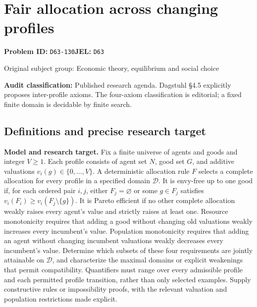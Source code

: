 \documentclass[11pt,a4paper]{article}
\begin{document}
\section*{Fair allocation across changing profiles}
\textbf{Problem ID:} \texttt{D63-130}\quad \textbf{JEL:} \texttt{D63}\par
\label{problem:OP-0278}
{\sffamily\small\color{muted}Original subject group: Economic theory, equilibrium and social choice\par}
\label{definitions:problem:30007560}
\textbf{Audit classification:} Published research agenda. Dagstuhl §4.5 explicitly proposes inter-profile axioms. The four-axiom classification is editorial; a fixed finite domain is decidable by finite search.
\subsection*{Definitions and precise research target}
\textbf{Model and research target.} Fix a finite universe of agents and goods and integer \(V\geq1\). Each profile consists of agent set \(N\), good set \(G\), and additive valuations \(v_i(g)\in\{0,\ldots,V\}\). A deterministic allocation rule \(F\) selects a complete allocation for every profile in a specified domain \(\mathcal D\). It is envy-free up to one good if, for each ordered pair \(i,j\), either \(F_j=\varnothing\) or some \(g\in F_j\) satisfies \(v_i(F_i)\geq v_i(F_j\setminus\{g\})\). It is Pareto efficient if no other complete allocation weakly raises every agent's value and strictly raises at least one. Resource monotonicity requires that adding a good without changing old valuations weakly increases every incumbent's value. Population monotonicity requires that adding an agent without changing incumbent valuations weakly decreases every incumbent's value. Determine which subsets of these four requirements are jointly attainable on \(\mathcal D\), and characterize the maximal domains or explicit weakenings that permit compatibility. Quantifiers must range over every admissible profile and each permitted profile transition, rather than only selected examples. Supply constructive rules or impossibility proofs, with the relevant valuation and population restrictions made explicit.
\end{document}
